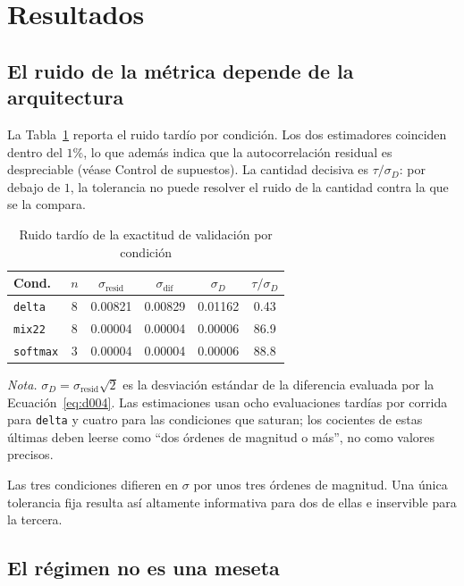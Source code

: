 \documentclass[jou,11pt,donotrepeattitle]{apa7}
\begin{document}
\section{Resultados}

\subsection{El ruido de la m\'etrica depende de la arquitectura}

La Tabla~\ref{tab:ruido} reporta el ruido tard\'io por condici\'on. Los dos estimadores coinciden
dentro del $1\%$, lo que adem\'as indica que la autocorrelaci\'on residual es despreciable
(v\'ease Control de supuestos). La cantidad decisiva es $\tau / \sigma_D$: por debajo de $1$, la
tolerancia no puede resolver el ruido de la cantidad contra la que se la compara.

\begin{table}[htbp]
\caption{Ruido tard\'io de la exactitud de validaci\'on por condici\'on}
\label{tab:ruido}
\small
\begin{tabular}{lccccc}
\toprule
Cond. & $n$ & $\sigma_{\text{resid}}$ & $\sigma_{\text{dif}}$ & $\sigma_D$ & $\tau/\sigma_D$ \\
\midrule
\texttt{delta}   & 8 & 0.00821 & 0.00829 & 0.01162 & 0.43 \\
\texttt{mix22}   & 8 & 0.00004 & 0.00004 & 0.00006 & 86.9 \\
\texttt{softmax} & 3 & 0.00004 & 0.00004 & 0.00006 & 88.8 \\
\bottomrule
\end{tabular}

\vspace{5pt}
{\small\raggedright \textit{Nota.} $\sigma_D = \sigma_{\text{resid}}\sqrt{2}$ es la desviaci\'on
est\'andar de la diferencia evaluada por la Ecuaci\'on~\ref{eq:d004}. Las estimaciones usan ocho
evaluaciones tard\'ias por corrida para \texttt{delta} y cuatro para las condiciones que saturan;
los cocientes de estas \'ultimas deben leerse como ``dos \'ordenes de magnitud o m\'as'', no como
valores precisos.
\par}
\end{table}

Las tres condiciones difieren en $\sigma$ por unos tres \'ordenes de magnitud. Una \'unica
tolerancia fija resulta as\'i altamente informativa para dos de ellas e inservible para la
tercera.

\subsection{El r\'egimen no es una meseta}
\end{document}
